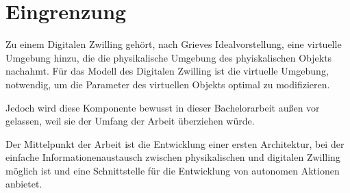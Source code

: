 \section{Eingrenzung}


Zu einem Digitalen Zwilling gehört, nach Grieves Idealvorstellung, eine virtuelle Umgebung hinzu, die die physikalische Umgebung des phyiskalischen Objekts nachahmt.
Für das Modell des Digitalen Zwilling ist die virtuelle Umgebung, notwendig, um die Parameter des virtuellen Objekts optimal zu modifizieren. 

Jedoch wird diese Komponente bewusst in dieser Bachelorarbeit außen vor gelassen, weil sie der Umfang der Arbeit überziehen würde.

Der Mittelpunkt der Arbeit ist die Entwicklung einer ersten Architektur, bei der einfache Informationenaustausch zwischen physikalischen und digitalen Zwilling möglich ist und eine Schnittstelle für die Entwicklung von autonomen Aktionen anbietet. 

